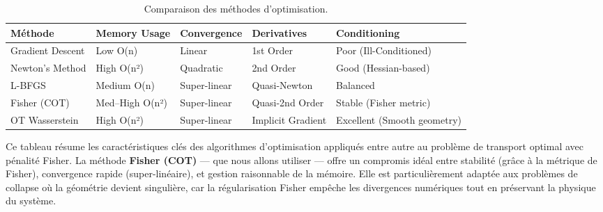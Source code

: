 \documentclass[a4paper,12pt]{article}
\begin{document}
\begin{table}[h]
\centering
\begin{tabularx}{\textwidth}{|>{\raggedright\arraybackslash}X|>{\centering\arraybackslash}X|>{\centering\arraybackslash}X|>{\centering\arraybackslash}X|>{\centering\arraybackslash}X|}
\hline
\textbf{Méthode} & \textbf{Memory Usage} & \textbf{Convergence} & \textbf{Derivatives} & \textbf{Conditioning} \\
\hline
Gradient Descent & Low O(n) & Linear & 1st Order & Poor (Ill-Conditioned) \\
\hline
Newton's Method & High O(n²) & Quadratic & 2nd Order & Good (Hessian-based) \\
\hline
L-BFGS & Medium O(n) & Super-linear & Quasi-Newton & Balanced \\
\hline
Fisher (COT) & Med–High O(n²) & Super-linear & Quasi-2nd Order & Stable (Fisher metric) \\
\hline
OT Wasserstein & High O(n²) & Super-linear & Implicit Gradient & Excellent (Smooth geometry) \\
\hline
\end{tabularx}
\caption{Comparaison des méthodes d'optimisation.}
\label{tab:optim-methods}
\end{table}

\noindent Ce tableau résume les caractéristiques clés des algorithmes d’optimisation appliqués entre autre au problème de transport optimal avec pénalité Fisher. La méthode \textbf{Fisher (COT)} — que nous allons utiliser — offre un compromis idéal entre stabilité (grâce à la métrique de Fisher), convergence rapide (super-linéaire), et gestion raisonnable de la mémoire. Elle est particulièrement adaptée aux problèmes de collapse où la géométrie devient singulière, car la régularisation Fisher empêche les divergences numériques tout en préservant la physique du système.

\medskip
\end{document}
